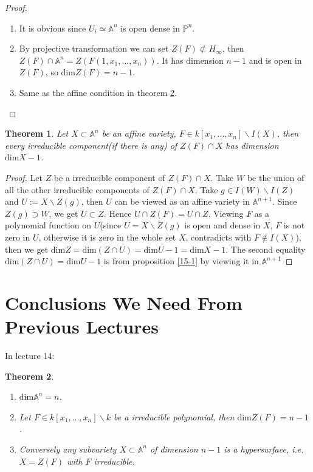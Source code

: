 \documentclass{amsart}
\theoremstyle{plain}
\newtheorem{theorem}{Theorem}
\theoremstyle{definition}
\theoremstyle{remark}
\numberwithin{equation}{section}
\begin{document}
\begin{proof}
	\begin{enumerate}
		\item It is obvious since $ U_i\simeq \mathbb{A}^n $ is open dense in $ \mathbb{P}^n $.
		\item By projective transformation we can set $ Z(F)\not\subset H_{\infty} $, then $ Z(F)\cap \mathbb{A}^n=Z(F(1,x_1,\dots,x_n)) $. It has dimension $ n-1 $ and is open in $ Z(F) $, so $ \text{dim}Z(F)=n-1 $.
		\item Same as the affine condition in theorem \ref{14-3}.  
	\end{enumerate}
\end{proof}
\begin{theorem}\label{15-3}
	Let $ X\subset \mathbb{A}^n $ be an affine variety, $ F\in k[x_1,\dots,x_n]\backslash I(X) $, then every irreducible component(if there is any) of $ Z(F)\cap X $ has dimension $ \text{dim}X-1 $.
\end{theorem}
\begin{proof}
	Let $ Z $ be a irreducible component of $ Z(F)\cap X $. Take $ W $ be the union of all the other irreducible components of $ Z(F)\cap X $. Take $ g\in I(W)\backslash I(Z) $ and $ U:=X\backslash Z(g) $, then $ U $ can be viewed as an affine variety in $ \mathbb{A}^{n+1} $. Since $ Z(g)\supset W $, we get $ U\subset Z $. Hence $ U\cap Z(F)=U\cap Z $. Viewing  $ F $ as a polynomial function on $ U $(since $ U=X\backslash Z(g) $ is open and dense in $ X $, $ F $ is not zero in $ U $, otherwise it is zero in the whole set $ X $, contradicts with  $ F\notin I(X) $), then we get 
	$ \text{dim}Z=\text{dim}(Z\cap U)=\text{dim}U-1=\text{dim}X-1 $. The second equality $ \text{dim}(Z\cap U)=\text{dim}U-1 $ is from  proposition \ref{15-1} by viewing it in $ \mathbb{A}^{n+1} $
\end{proof}
\section{ Conclusions We Need From Previous Lectures }
In lecture 14:
\begin{theorem}\label{14-3}
	\begin{enumerate}
		\item $ \text{dim}\mathbb{A}^n=n $.
		\item Let $ F\in k[x_1,\dots,x_n]\backslash k $ be a irreducible polynomial, then $ \text{dim}Z(F)=n-1 $.
		\item Conversely any subvariety $ X\subset \mathbb{A}^n $ of dimension $ n-1 $ is a hypersurface, i.e. $ X=Z(F) $ with $ F $ irreducible.
	\end{enumerate}
\end{theorem}
\end{document}
